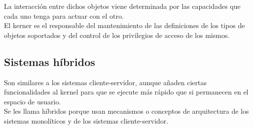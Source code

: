 \documentclass[spanish, 12pt]{article}
\begin{document}
			La interacción entre dichos objetos viene determinada por las capacidades que cada uno tenga para actuar con el otro.\\
			
			El kerner es el responsable del mantenimiento de las definiciones de los tipos de objetos soportados y del control de los privilegios de acceso de los mismos.\\
			
			\centerline{}
			
		\subsection{Sistemas híbridos}
		
			Son similares a los sistemas cliente-servidor, aunque añaden ciertas funcionalidades al kernel para que se ejecute más rápido que si permanecen en el espacio de usuario.\\
			
			Se les llama híbridos porque usan mecanismos o conceptos de arquitectura de los sistemas monolíticos y de los sistemas cliente-servidor.\\
			
\end{document}
